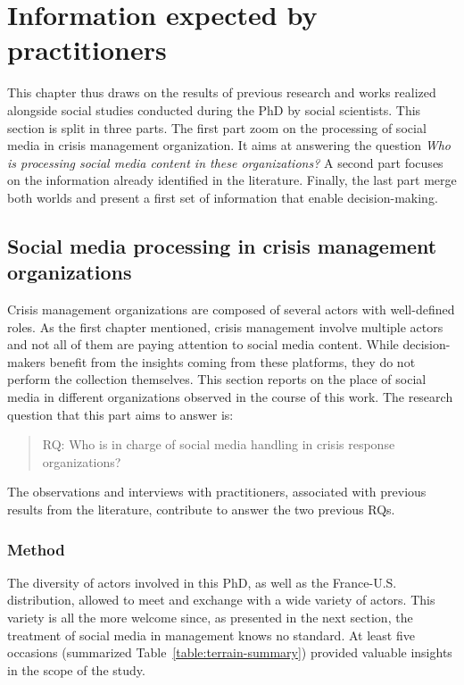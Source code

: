 \section{Information expected by practitioners}
This chapter thus draws on the results of previous research and works realized alongside social studies conducted during the PhD by social scientists.
This section is split in three parts.
The first part zoom on the processing of social media in crisis management organization.
It aims at answering the question \textit{Who is processing social media content in these organizations?}
A second part focuses on the information already identified in the literature.
Finally, the last part merge both worlds and present a first set of information that enable decision-making.

\subsection{Social media processing in crisis management organizations}
Crisis management organizations are composed of several actors with well-defined roles.
As the first chapter mentioned, crisis management involve multiple actors and not all of them are paying attention to social media content.
While decision-makers benefit from the insights coming from these platforms, they do not perform the collection themselves.
This section reports on the place of social media in different organizations observed in the course of this work.
The research question that this part aims to answer is:
\blockquote{RQ: Who is in charge of social media handling in crisis response organizations?}
The observations and interviews with practitioners, associated with previous results from the literature, contribute to answer the two previous RQs.

\subsubsection{Method}
The diversity of actors involved in this PhD, as well as the France-U.S. distribution, allowed to meet and exchange with a wide variety of actors.
This variety is all the more welcome since, as presented in the next section, the treatment of social media in management knows no standard.
At least five occasions (summarized Table~\ref{table:terrain-summary}) provided valuable insights in the scope of the study.

